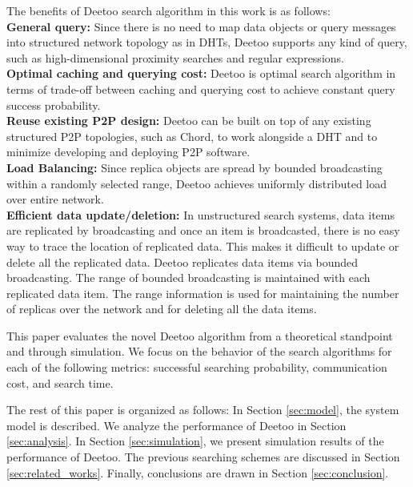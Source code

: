 \documentclass[conference]{IEEEtran}
\begin{document}
The benefits of Deetoo search algorithm in this work is as follows:\\ 
{\bf General query:} Since there is no need to map data objects or query 
messages into structured network topology as in DHTs, Deetoo supports
any kind of query, such as high-dimensional proximity searches and regular 
expressions.\\
{\bf Optimal caching and querying cost:} Deetoo is optimal search algorithm
in terms of trade-off between caching and querying cost to achieve 
constant query success probability.\\
{\bf Reuse existing P2P design:}
Deetoo can be built on top of any existing structured P2P topologies, such as
Chord, to work alongside a DHT and to minimize developing and deploying P2P 
software.\\
{\bf Load Balancing:} 
Since replica objects are spread by bounded broadcasting within 
a randomly selected range, Deetoo achieves uniformly distributed 
load over entire network. \\
{\bf Efficient data update/deletion:} In unstructured search systems, 
data items are replicated by broadcasting and once an item is broadcasted, 
there is no easy way to trace the location of replicated data. 
This makes it difficult to update or delete all the replicated data.
Deetoo replicates data items via bounded broadcasting. 
The range of bounded broadcasting is maintained with each replicated data item.  
The range information is used for maintaining
the number of replicas over the network and for deleting all the data items.

This paper evaluates the novel Deetoo algorithm from a theoretical 
standpoint and through simulation. 
We focus on the behavior of the search algorithms for each of the
following metrics: successful searching probability,
communication cost, and search time. 

The rest of this paper is organized as follows: 
In Section \ref{sec:model}, the system model
is described. We analyze the performance of Deetoo in
Section \ref{sec:analysis}. In Section \ref{sec:simulation}, we present
simulation results of the performance of Deetoo. 
The previous searching 
schemes are discussed in Section \ref{sec:related_works}. 
Finally, conclusions are drawn in Section \ref{sec:conclusion}.
\end{document}
